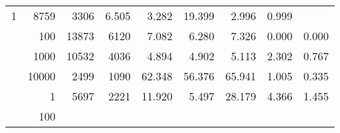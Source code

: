 \begin{table}
\begin{tabular}{rrrrrrrrr}
					
					 
					\multirow{ 1 }{*}{ 1 } &
					
						
							    
							     8759  & 3306  
	                           & 6.505 & 3.282 & 19.399
	                           & 2.996 & 0.999  \\
	                
	            
					 &  
					 
					\multirow{ 1 }{*}{ 100 } &
					
						
							    
							     13873  & 6120  
	                           & 7.082 & 6.280 & 7.326
	                           & 0.000 & 0.000  \\
	                
	            
					 &  
					 
					\multirow{ 1 }{*}{ 1000 } &
					
						
							    
							     10532  & 4036  
	                           & 4.894 & 4.902 & 5.113
	                           & 2.302 & 0.767  \\
	                
	            
					 &  
					 
					\multirow{ 1 }{*}{ 10000 } &
					
						
							    
							     2499  & 1090  
	                           & 62.348 & 56.376 & 65.941
	                           & 1.005 & 0.335  \\
	                
	            
	        
				\noalign{\smallskip}\hline
				\multirow{ 4 }{*}{ 2000000 } &
				
					
					 
					\multirow{ 1 }{*}{ 1 } &
					
						
							    
							     5697  & 2221  
	                           & 11.920 & 5.497 & 28.179
	                           & 4.366 & 1.455  \\
	                
	            
					 &  
					 
					\multirow{ 1 }{*}{ 100 } &
					
						
							    

\end{tabular}
\end{table}

